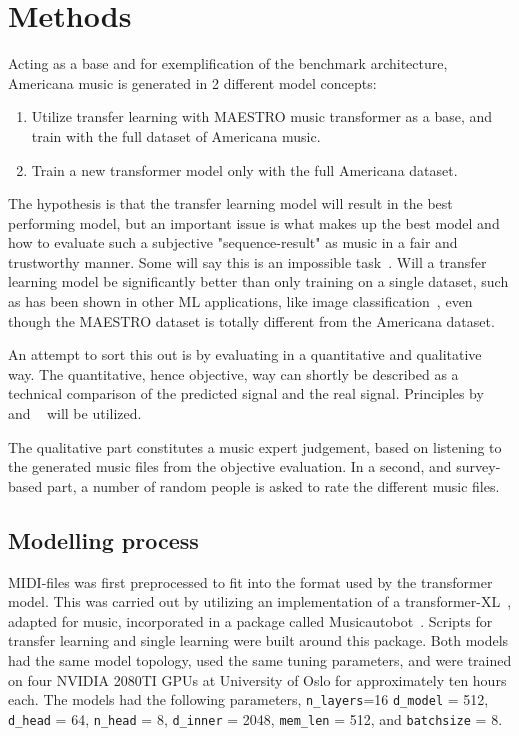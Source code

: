 \documentclass{IEEEtran}
\begin{document}
\section{Methods}

Acting as a base and for exemplification of the benchmark architecture,
Americana music is generated in 2 different model concepts:
\begin{enumerate}
    \item Utilize transfer learning with MAESTRO music transformer as a base,
        and train with the full dataset of Americana music.
    \item Train a new transformer model only with the full
        Americana dataset.
\end{enumerate}

The hypothesis is that the transfer learning model will result in the best
performing
model, but an important issue is what makes up the best model and how to
evaluate such a subjective "sequence-result" as music in a fair and
trustworthy manner. Some will say this is an impossible task~\cite{1030094}.
Will a transfer learning model be significantly better than only training on
a single dataset, such as has been shown in other ML applications, like image
classification~\cite{7404017}, even though the MAESTRO dataset is totally
different from the Americana dataset.

An attempt to sort this out is by evaluating in a quantitative and
qualitative way. The quantitative, hence objective, way can shortly be
described as a technical comparison of the predicted signal and the real
signal. Principles by \citeauthor{yang2020evaluation}~\cite{yang2020evaluation}
and \citeauthor{wu2020jazz}~\cite{wu2020jazz} will be utilized.

The qualitative part constitutes a music expert judgement, based on listening
to the generated music files from the objective evaluation. In a second, and
survey-based part, a number of random people is asked to rate the different
music files.

\subsection{Modelling process}

MIDI-files was first preprocessed to fit into
the format used by the transformer model. This was carried out by utilizing
an implementation of a transformer-XL~\cite{dai2019transformerxl}, adapted for 
music, incorporated in a
package called Musicautobot~\cite{musicautobot}. Scripts for transfer learning
and single learning were built around this package. Both models had the same
model topology, used the same tuning parameters, and were trained on 
four NVIDIA 2080TI GPUs at University of Oslo for approximately ten 
hours each. The models had the following parameters, \lstinline|n_layers|=16
\lstinline|d_model| = 512, \lstinline|d_head| = 64,
\lstinline|n_head| = 8, \lstinline|d_inner| = 2048, \lstinline|mem_len| = 512,
and \lstinline|batchsize| = 8.
\end{document}
